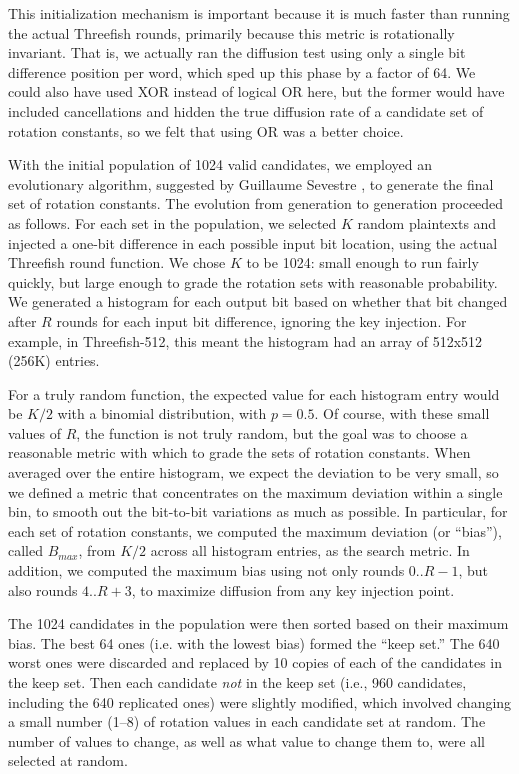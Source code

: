 \documentclass[11pt,twoside]{article}
\begin{document}
This initialization mechanism is important because it is much faster than running the actual Threefish rounds, primarily because this metric is rotationally invariant. That is, we actually ran the diffusion test using only a single bit difference position per word, which sped up this phase by a factor of 64. We could also have used XOR instead of logical OR here, but the former would have included cancellations and hidden the true diffusion rate of a candidate set of rotation constants, so we felt that using OR was a better choice.

With the initial population of 1024 valid candidates, we employed an evolutionary algorithm, suggested by Guillaume Sevestre \cite{Sev09}, to generate the final set of rotation constants.  The evolution from generation to generation proceeded as follows. For each set in the population, we selected $K$ random plaintexts and injected a one-bit difference in each possible input bit location, using the actual Threefish round function.  We chose $K$ to be 1024: small enough to run fairly quickly, but large enough to grade the rotation sets with reasonable probability. We generated a histogram for each output bit based on whether that bit changed after $R$ rounds for each input bit difference, ignoring the key injection.  For example, in Threefish-512, this meant the histogram had an array of 512x512 (256K) entries. 

For a truly random function, the expected value for each histogram entry would be $K/2$ with a binomial distribution, with $p=0.5$.  Of course, with these small values of $R$, the function is not truly random, but the goal was to choose a reasonable metric with which to grade the sets of rotation constants. When averaged over the entire
histogram, we expect the deviation to be very small, so we defined a metric that concentrates on the maximum deviation within a single bin, to smooth out the bit-to-bit variations as much as possible.  In particular, for each set of rotation constants, we computed the maximum deviation (or ``bias''), called $B_{max}$, from $K/2$ across all histogram entries, as the search metric. In addition, we computed the maximum bias using not only rounds $0..R-1$, but also rounds $4..R+3$, to maximize diffusion from any key injection point. 

The 1024 candidates in the population were then sorted based on their maximum bias. The best 64 ones (i.e. with the lowest bias) formed the ``keep set.''  The 640 worst ones were discarded and replaced by 10 copies of each of the candidates in the keep set.  Then each candidate \emph{not} in the keep set (i.e., 960 candidates, including the 640 replicated ones) were slightly modified, which involved changing a small number (1--8) of rotation values in each candidate set at random. The number of values to change, as well as what value to change them to, were all selected at random. 
\end{document}
